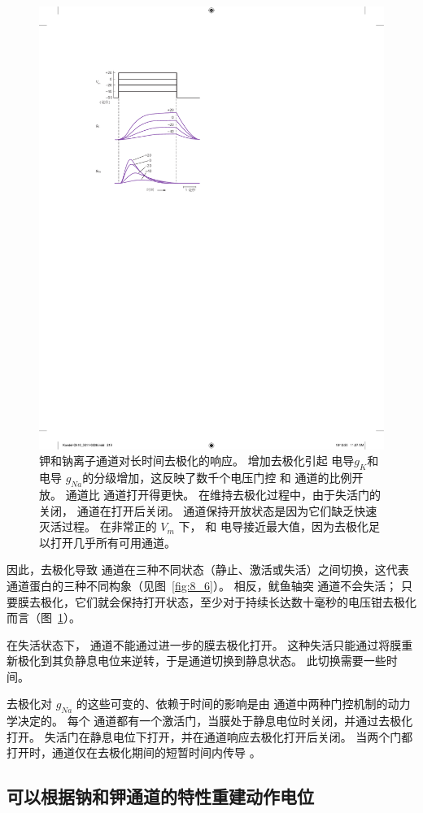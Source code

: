 \begin{figure}[htbp]
	\centering
	\includegraphics[width=0.55\linewidth]{chap10/fig_10_6}
	\caption{钾和钠离子通道对长时间去极化的响应。
		增加去极化引起  电导$g_K$和  电导 $g_{Na}$的分级增加，这反映了数千个电压门控  和  通道的比例开放。
		 通道比  通道打开得更快。
		在维持去极化过程中，由于失活门的关闭， 通道在打开后关闭。
		 通道保持开放状态是因为它们缺乏快速灭活过程。
		在非常正的 $V_m$ 下， 和  电导接近最大值，因为去极化足以打开几乎所有可用通道。}
	\label{fig:10_6}
\end{figure}


因此，去极化导致  通道在三种不同状态（静止、激活或失活）之间切换，这代表  通道蛋白的三种不同构象（见图~\ref{fig:8_6}）。
相反，鱿鱼轴突  通道不会失活；
只要膜去极化，它们就会保持打开状态，至少对于持续长达数十毫秒的电压钳去极化而言（图~\ref{fig:10_6}）。


在失活状态下， 通道不能通过进一步的膜去极化打开。
这种失活只能通过将膜重新极化到其负静息电位来逆转，于是通道切换到静息状态。
此切换需要一些时间。


去极化对 $g_{Na}$ 的这些可变的、依赖于时间的影响是由  通道中两种门控机制的动力学决定的。
每个  通道都有一个激活门，当膜处于静息电位时关闭，并通过去极化打开。
失活门在静息电位下打开，并在通道响应去极化打开后关闭。
当两个门都打开时，通道仅在去极化期间的短暂时间内传导 。



\subsection{可以根据钠和钾通道的特性重建动作电位}

